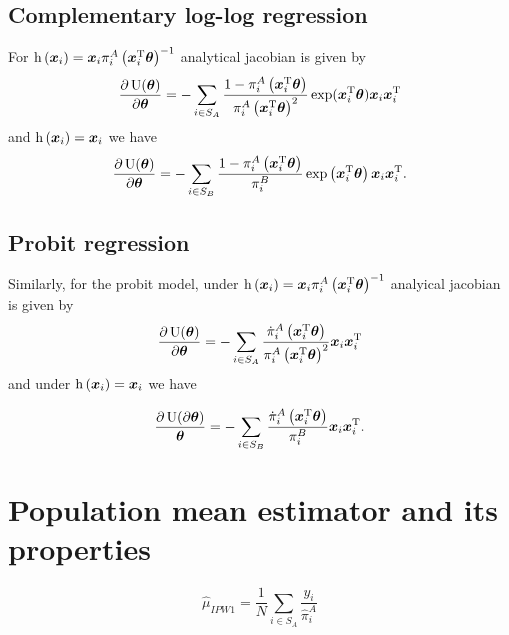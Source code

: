 \documentclass[
  letterpaper,
  DIV=11,
  numbers=noendperiod]{scrreprt}
\begin{document}
\hypertarget{complementary-log-log-regression-1}{%
\subsection{Complementary log-log
regression}\label{complementary-log-log-regression-1}}

For
\(\operatorname{h}\left(\boldsymbol{x}_i\right) = \boldsymbol{x}_i \pi_i^A\left(\boldsymbol{x}_i^{\mathrm{T}} \boldsymbol{\theta} \right)^{-1}\)
analytical jacobian is given by \[
    \frac{\partial \operatorname{U}(\boldsymbol{\theta})}{\partial \boldsymbol{\theta}} = - \sum_{i \in S_A} \frac{1 - \pi_i^A\left(\boldsymbol{x}_i^{\mathrm{T}} \boldsymbol{\theta} \right)}{\pi_i^A\left(\boldsymbol{x}_i^{\mathrm{T}} \boldsymbol{\theta} \right)^2} \exp(\boldsymbol{x}_i^{\mathrm{T}} \boldsymbol{\theta}) \boldsymbol{x}_i \boldsymbol{x}_i^{\mathrm{T}}
\] and \(\operatorname{h}\left(\boldsymbol{x}_i\right) = \boldsymbol{x}_i\) we have \[
    \frac{\partial \operatorname{U}(\boldsymbol{\theta})}{\partial \boldsymbol{\theta}} = - \sum_{i \in S_B} \frac{1 - \pi_i^A\left(\boldsymbol{x}_i^{\mathrm{T}} \boldsymbol{\theta} \right)}{\pi_i^B} \exp \left(\boldsymbol{x}_i^\mathrm{T} \boldsymbol{\theta}\right) \boldsymbol{x}_i \boldsymbol{x}_i^{\mathrm{T}}.
\]

\hypertarget{probit-regression-1}{%
\subsection{Probit regression}\label{probit-regression-1}}

Similarly, for the probit model, under
\(\operatorname{h}\left(\boldsymbol{x}_i\right) = \boldsymbol{x}_i \pi_i^A\left(\boldsymbol{x}_i^{\mathrm{T}} \boldsymbol{\theta} \right)^{-1}\)
analyical jacobian is given by \[
    \frac{\partial \operatorname{U}(\boldsymbol{\theta})}{\partial \boldsymbol{\theta}} = - \sum_{i \in S_A} \frac{\dot{\pi}_i^A\left(\boldsymbol{x}_i^{\mathrm{T}} \boldsymbol{\theta} \right)}{\pi_i^A\left(\boldsymbol{x}_i^{\mathrm{T}} \boldsymbol{\theta} \right)^2} \boldsymbol{x}_i \boldsymbol{x}_i^{\mathrm{T}}
\] and under \(\operatorname{h}\left(\boldsymbol{x}_i\right) = \boldsymbol{x}_i\) we have

\[
    \frac{\partial \operatorname{U}(\partial \boldsymbol{\theta})}{\boldsymbol{\theta}} = - \sum_{i \in S_B} \frac{\dot{\pi}_i^A\left(\boldsymbol{x}_i^{\mathrm{T}} \boldsymbol{\theta} \right)}{\pi_i^B} \boldsymbol{x}_i \boldsymbol{x}_i^{\mathrm{T}}.
\]

\hypertarget{population-mean-estimator-and-its-properties}{%
\section{Population mean estimator and its
properties}\label{population-mean-estimator-and-its-properties}}

\[
\begin{equation*}
    \hat{\mu}_{IPW1} = \frac{1}{N} \sum_{i \in S_A} \frac{y_i}{\hat{\pi}_i^{A}}
\end{equation*}
\]
\end{document}
